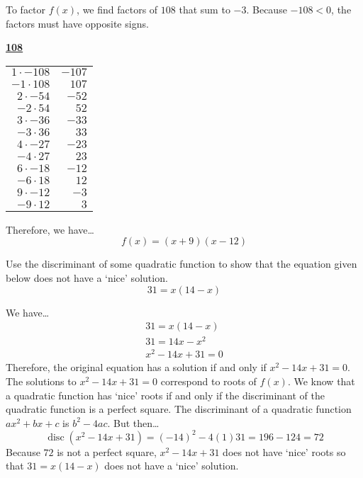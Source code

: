 \documentclass[12pt,letterpaper]{exam}
\DeclareMathOperator{\disc}{disc}
\begin{document}
\begin{questions}
To factor $f(x)$, we find factors of $108$ that sum to $-3$. Because $-108 < 0$, the factors must have opposite signs. \par
	\begin{table}[!ht]
	\centering
	\underline{\bfseries 108} \pvspace{0.2cm}
	\begin{tabular}{rr} 
	$1 \cdot -108$ & $-107$ \\
	$-1 \cdot 108$ & $107$ \\
	$2 \cdot -54$ & $-52$ \\
	$-2 \cdot 54$ & $52$ \\
	$3 \cdot -36$ & $-33$ \\
	$-3 \cdot 36$ & $33$ \\
	$4 \cdot -27$ & $-23$ \\
	$-4 \cdot 27$ & $23$ \\
	$6 \cdot -18$ & $-12$ \\
	$-6 \cdot 18$ & $12$ \\ \hline
	\multicolumn{1}{|r}{$9 \cdot -12$} & \multicolumn{1}{r|}{$-3$} \\ \hline
	$-9 \cdot 12$ & $3$
	\end{tabular}
	\end{table} \par
Therefore, we have\dots
	\[
	f(x)= (x + 9)(x - 12)
	\]



\newpage
\question[10] Use the discriminant of some quadratic function to show that the equation given below does not have a `nice' solution.
	\[
	31= x(14 - x)
	\] \pspace

\sol We have\dots
	\[
	\begin{gathered}
	31= x(14 - x) \\[0.3cm]
	31= 14x - x^2 \\[0.3cm]
	x^2 - 14x + 31= 0 
	\end{gathered}
	\]
Therefore, the original equation has a solution if and only if $x^2 - 14x + 31= 0$. The solutions to $x^2 - 14x + 31= 0$ correspond to roots of $f(x)$. We know that a quadratic function has `nice' roots if and only if the discriminant of the quadratic function is a perfect square. The discriminant of a quadratic function $ax^2 + bx + c$ is $b^2 - 4ac$. But then\dots
	\[
	\disc(x^2 - 14x + 31)= (-14)^2 - 4(1)31= 196 - 124= 72
	\]
Because $72$ is not a perfect square, $x^2 - 14x + 31$ does not have `nice' roots so that $31= x(14 - x)$ does not have a `nice' solution. 




\end{questions}
\end{document}
